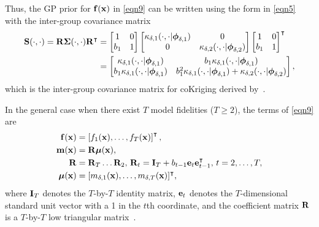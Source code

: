 \documentclass[journal ]{new-aiaa}
\begin{document}
	Thus, the GP prior for ${\bf f}({\bf x})$ in \cref{eqn9} can be written using the form in \cref{eqn5} with the inter-group covariance matrix
	\begin{equation}\label{eqn11}
		\begin{aligned}
			{\bf S}(\cdot,\cdot)  = {\bf R} {\boldsymbol \Sigma}(\cdot,\cdot) {\bf R}^\intercal
			&= \left[\begin{matrix}
				1 & 0 \\
				b_1 & 1
			\end{matrix}\right] 
			\left[\begin{matrix}
				\kappa_{\delta,1}(\cdot,\cdot|{\boldsymbol \phi}_{\delta,1}) & 0 \\
				0 & \kappa_{\delta,2}(\cdot,\cdot|{\boldsymbol \phi}_{\delta,2})
			\end{matrix}\right]
			\left[\begin{matrix}
				1 & 0 \\
				b_1 & 1
			\end{matrix}\right]^\intercal \\
			& = \left[\begin{matrix}
				\kappa_{\delta,1}(\cdot,\cdot|{\boldsymbol \phi}_{\delta,1}) & b_1 \kappa_{\delta,1}(\cdot,\cdot|{\boldsymbol \phi}_{\delta,1}) \\
				b_1 \kappa_{\delta,1}(\cdot,\cdot|{\boldsymbol \phi}_{\delta,1}) & b_1^2 \kappa_{\delta,1}(\cdot,\cdot|{\boldsymbol \phi}_{\delta,1})+\kappa_{\delta,2}(\cdot,\cdot|{\boldsymbol \phi}_{\delta,2})
			\end{matrix}\right], 
		\end{aligned}
	\end{equation}
	which is the inter-group covariance matrix for coKriging derived by~\citet{Forrester2007}.
	
	In the general case when there exist $T$ model fidelities ($T \geq 2$), the terms of \cref{eqn9} are
	\begin{subequations}\label{eqn12}
		\begin{align}
			{\bf f}({\bf x}) & = \left[f_1({\bf x}),\dots,f_T({\bf x})\right]^\intercal, \label{eqn12-1}\\
			{\bf m}({\bf x}) & = {\bf R} \boldsymbol{\mu}({\bf x}), \label{eqn12-2}\\
			{\bf R} & = {\bf R}_T\dots {\bf R}_2, \, {\bf R}_t = {\bf I}_T + b_{t-1} {\bf e}_t {\bf e}^\intercal_{t-1}, \, t=2,\dots,T, \label{eqn12-3}\\
			\boldsymbol{\mu}({\bf x}) & = [m_{\delta,1}({\bf x}),\dots,m_{\delta,T}({\bf x})]^\intercal \label{eqn12-4},
		\end{align}
	\end{subequations}
	where ${\bf I}_T$ denotes the $T$-by-$T$ identity matrix, ${\bf e}_t$ denotes the $T$-dimensional standard unit vector with a 1 in the $t$th coordinate, and the coefficient matrix ${\bf R}$ is a $T$-by-$T$ low triangular matrix~\citep{Garland2020}.
	
\end{document}
